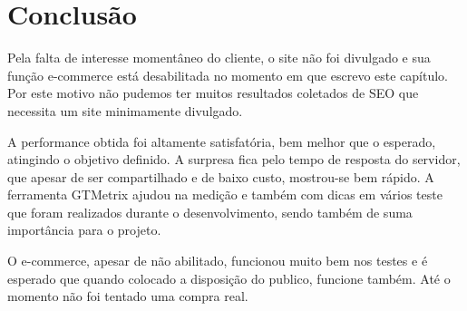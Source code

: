 \chapter{Conclusão}

Pela falta de interesse momentâneo do cliente, o site não foi divulgado e sua função e-commerce está desabilitada no momento em que escrevo este capítulo. Por este motivo não pudemos ter muitos resultados coletados de SEO que necessita um site minimamente divulgado.

A performance obtida foi altamente satisfatória, bem melhor que o esperado, atingindo o objetivo definido. A surpresa fica pelo tempo de resposta do servidor, que apesar de ser compartilhado e de baixo custo, mostrou-se bem rápido. A ferramenta GTMetrix ajudou na medição e também com dicas em vários teste que foram realizados durante o desenvolvimento, sendo também de suma importância para o projeto.

O e-commerce, apesar de não abilitado, funcionou muito bem nos testes e é esperado que quando colocado a disposição do publico, funcione também. Até o momento não foi tentado uma compra real.